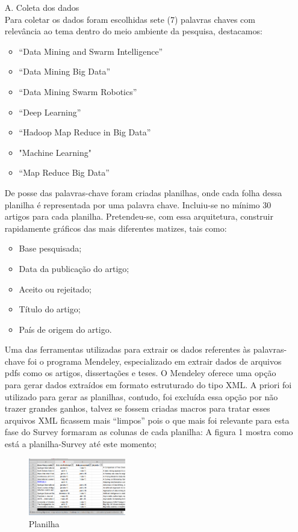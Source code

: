 \documentclass[conference,compsoc]{IEEEtran}
\begin{document}
\begin{enumerate}
 \item[A.] Coleta dos dados\\
 Para coletar os dados foram escolhidas sete (7) palavras chaves com relevância ao tema dentro do meio ambiente da pesquisa, destacamos:
  \begin{itemize}
    \item “Data Mining and Swarm Intelligence”
    \item “Data Mining Big Data”
    \item “Data Mining Swarm Robotics”
    \item “Deep Learning”
	\item “Hadoop Map Reduce in Big Data”    
    \item "Machine Learning"
    \item “Map Reduce Big Data”
  \end{itemize}


 De posse das palavras-chave foram criadas planilhas, onde cada folha dessa planilha é representada por uma palavra chave. 
 Incluiu-se no mínimo 30 artigos para cada planilha. 
 Pretendeu-se, com essa arquitetura, construir rapidamente gráficos das mais diferentes matizes, tais como:
  \begin{itemize}
    \item Base pesquisada;
    \item Data da publicação do artigo;
    \item Aceito ou rejeitado;
    \item Título do artigo;
    \item País de origem do artigo.
  \end{itemize}

  Uma das ferramentas utilizadas para extrair os dados referentes às palavras-chave foi o programa Mendeley, especializado
  em extrair dados de arquivos pdfs como os artigos, dissertações e teses. O Mendeley oferece uma opção para gerar dados 
  extraídos em formato estruturado do tipo XML. A priori foi utilizado para gerar as planilhas, contudo, foi excluída essa
  opção por não trazer grandes ganhos, talvez se fossem criadas macros para tratar esses arquivos XML ficassem mais ``limpos''
  pois o que mais foi relevante para esta fase do Survey formaram as colunas de cada planilha:
  A figura 1 mostra como está a planilha-Survey até este momento;
  
 
  \begin{figure}[!ht]
  \centering %
  \caption{Planilha}
  \flushright
  \includegraphics[width=0.4\textwidth]{Figuras/PlanilhaSrvey.png}
  \end{figure}
  

\end{enumerate}
\end{document}
